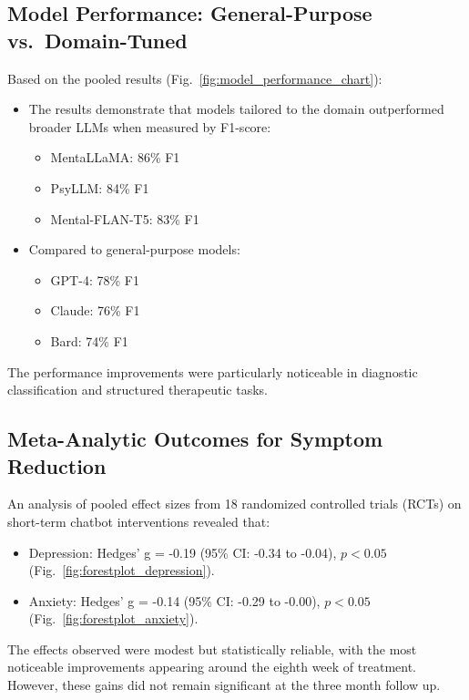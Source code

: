 \documentclass[sn-basic,authoryear]{sn-jnl}
\begin{document}
\subsection{Model Performance: General-Purpose vs.\ Domain-Tuned}
Based on the pooled results (Fig.~\ref{fig:model_performance_chart}):
\begin{itemize}
    \item The results demonstrate that models tailored to the domain outperformed broader LLMs when measured by F1-score:
    \begin{itemize}
        \item MentaLLaMA: 86\% F1
        \item PsyLLM: 84\% F1
        \item Mental-FLAN-T5: 83\% F1
    \end{itemize}
    \item Compared to general-purpose models:
    \begin{itemize}
        \item GPT-4: 78\% F1
        \item Claude: 76\% F1
        \item Bard: 74\% F1
    \end{itemize}
\end{itemize}
The performance improvements were particularly noticeable in diagnostic classification and structured therapeutic tasks.

\subsection{Meta-Analytic Outcomes for Symptom Reduction}
An analysis of pooled effect sizes from 18 randomized controlled trials (RCTs) on short-term chatbot interventions \citep{Zhong2024} revealed that:
\begin{itemize}
    \item Depression: Hedges' g = -0.19 (95\% CI: -0.34 to -0.04), $p < 0.05$ (Fig.~\ref{fig:forestplot_depression}).
    \item Anxiety: Hedges' g = -0.14 (95\% CI: -0.29 to -0.00), $p < 0.05$ (Fig.~\ref{fig:forestplot_anxiety}).
\end{itemize}
The effects observed were modest but statistically reliable, with the most noticeable improvements appearing around the eighth week of treatment. However, these gains did not remain significant at the three month follow up.
\end{document}
